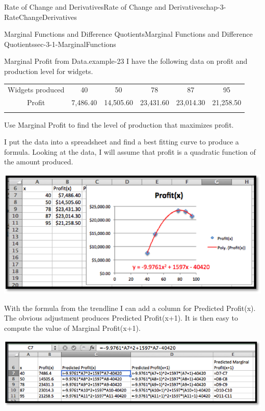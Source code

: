 \documentclass[oneside,10pt,]{book}
\numberwithin{equation}{section}
\newcommand{\hrulethin}  {\noalign{\hrule height 0.04em}}
\newcommand{\hrulethick} {\noalign{\hrule height 0.11em}}
\begin{document}
\begin{chapterptx}{Rate of Change and Derivatives}{}{Rate of Change and Derivatives}{}{}{chap-3-RateChangeDerivatives}
\begin{sectionptx}{Marginal Functions and Difference Quotients}{}{Marginal Functions and Difference Quotients}{}{}{sec-3-1-MarginalFunctions}
\begin{example}{Marginal Profit from Data.}{example-23}%
\hypertarget{p-923}{}%
I have the following data on profit and production level for widgets.%
\begin{sidebyside}{1}{0}{0}{0}%
\begin{sbspanel}{1}%
{\centering%
\begin{tabular}{cccccc}\hrulethick
Widgets produced&40&50&78&87&95\tabularnewline\hrulethin
Profit&\textdollar{}7,486.40&\textdollar{}14,505.60&\textdollar{}23,431.60&\textdollar{}23,014.30&\textdollar{}21,258.50\tabularnewline\hrulethin
\end{tabular}
\par}
\end{sbspanel}%
\end{sidebyside}%
\par
\hypertarget{p-924}{}%
Use Marginal Profit to find the level of production that maximizes profit.%
\par
\hypertarget{p-925}{}%
I put the data into a spreadsheet and find a best fitting curve to produce a formula.  Looking at the data, I will assume that profit is a quadratic function of the amount produced.%
\begin{sidebyside}{1}{0.15}{0.15}{0}%
\begin{sbspanel}{0.7}%
\includegraphics[width=1\linewidth]{images/sec3-1-7.png}
\end{sbspanel}%
\end{sidebyside}%
\par
\hypertarget{p-926}{}%
With the formula from the trendline I can add a column for Predicted Profit(x).  The obvious adjustment produces Predicted Profit(x+1).  It is then easy to compute the value of Marginal Profit(x+1).%
\begin{sidebyside}{1}{0}{0}{0}%
\begin{sbspanel}{1}%
\includegraphics[width=1\linewidth]{images/sec3-1-8.png}

\end{sbspanel}
\end{sidebyside}
\end{example}
\end{sectionptx}
\end{chapterptx}
\end{document}
